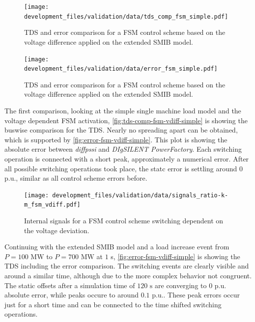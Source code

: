 \begin{figure}[htbp!]
    \centering
    \texttt{[image: development\_files/validation/data/tds\_comp\_fsm\_simple.pdf]}
    \caption[\acs{TDS} and error comparison for a \acs{FSM} control scheme based on the voltage difference applied on the extended \acs{SMIB} model]{\acs{TDS} and error comparison for a \acs{FSM} control scheme based on the voltage difference applied on the extended \acs{SMIB} model.}
    \label{fig:tds-comp-fsm-vdiff-simple}
\end{figure}

\begin{figure}[htbp!]
    \centering
    \texttt{[image: development\_files/validation/data/error\_fsm\_simple.pdf]}
    \caption[\acs{TDS} and error comparison for a \acs{FSM} control scheme based on the voltage difference applied on the extended \acs{SMIB} model]{\acs{TDS} and error comparison for a \acs{FSM} control scheme based on the voltage difference applied on the extended \acs{SMIB} model.}
    \label{fig:error-fsm-vdiff-simple}
\end{figure}

The first comparison, looking at the simple single machine load model and the voltage dependent \acs{FSM} activation, \autoref{fig:tds-comp-fsm-vdiff-simple} is showing the buswise comparison for the \acs{TDS}.
Nearly no spreading apart can be obtained, which is supported by \autoref{fig:error-fsm-vdiff-simple}.
This plot is showing the absolute error between \textit{diffpssi} and \textit{DIgSILENT PowerFactory}.
Each switching operation is connected with a short peak, approximately a numerical error.
After all possible switching operations took place, the statc error is settling around $0$ p.u., similar as all control scheme errors before.

\begin{figure}[htbp!]
    \centering
    \texttt{[image: development\_files/validation/data/signals\_ratio-k-m\_fsm\_vdiff.pdf]}
    \caption[Internal signals for a \acs{FSM} control scheme switching dependent on the voltage deviation]{Internal signals for a \acs{FSM} control scheme switching dependent on the voltage deviation.}
    \label{fig:signals-fsm-vdiff-ext-smib}
\end{figure}

Continuing with the extended \acs{SMIB} model and a load increase event from $P=100\text{ MW}$ to $P=700\text{ MW}$ at $1$ s, \autoref{fig:error-fsm-vdiff-simple} is showing the \acs{TDS} including the error comparison.
The switching events are clearly visible and around a similar time, although due to the more complex behavior not congruent.
The static offsets after a simulation time of $120\text{ s}$ are converging to $0$ p.u. absolute error, while peaks occure to around $0.1$ p.u..
These peak errors occur just for a short time and can be connected to the time shifted switching operations.

